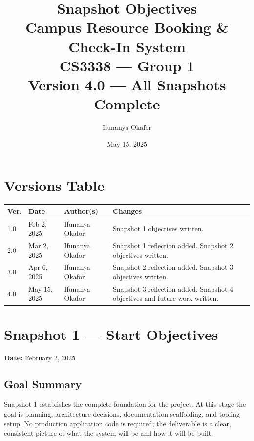 \documentclass[12pt]{article}
\title{
    \vspace{2cm}
    {\Large Snapshot Objectives} \\[1em]
    {\LARGE \textbf{Campus Resource Booking \& Check-In System}} \\[2em]
    {\large CS3338 --- Group 1} \\[0.5em]
    {\normalsize Version 4.0 --- All Snapshots Complete}
    \vspace{2cm}
}
\author{Ifunanya Okafor}
\date{May 15, 2025}
\begin{document}
\maketitle
\thispagestyle{empty}
\newpage

\tableofcontents
\newpage

\section*{Versions Table}

\begin{longtable}{|p{1.4cm}|p{2.4cm}|p{3.5cm}|p{6.5cm}|}
\hline
\textbf{Ver.} & \textbf{Date} & \textbf{Author(s)} & \textbf{Changes} \\
\hline
1.0 & Feb 2, 2025  & Ifunanya Okafor & Snapshot 1 objectives written. \\
\hline
2.0 & Mar 2, 2025  & Ifunanya Okafor & Snapshot 1 reflection added. Snapshot 2 objectives written. \\
\hline
3.0 & Apr 6, 2025  & Ifunanya Okafor & Snapshot 2 reflection added. Snapshot 3 objectives written. \\
\hline
4.0 & May 15, 2025 & Ifunanya Okafor & Snapshot 3 reflection added. Snapshot 4 objectives and future work written. \\
\hline
\end{longtable}
\newpage

\section{Snapshot 1 --- Start Objectives}
\textbf{Date:} February 2, 2025

\subsection{Goal Summary}
Snapshot 1 establishes the complete foundation for the project. At this stage the goal is planning, architecture decisions, documentation scaffolding, and tooling setup. No production application code is required; the deliverable is a clear, consistent picture of what the system will be and how it will be built.
\end{document}
